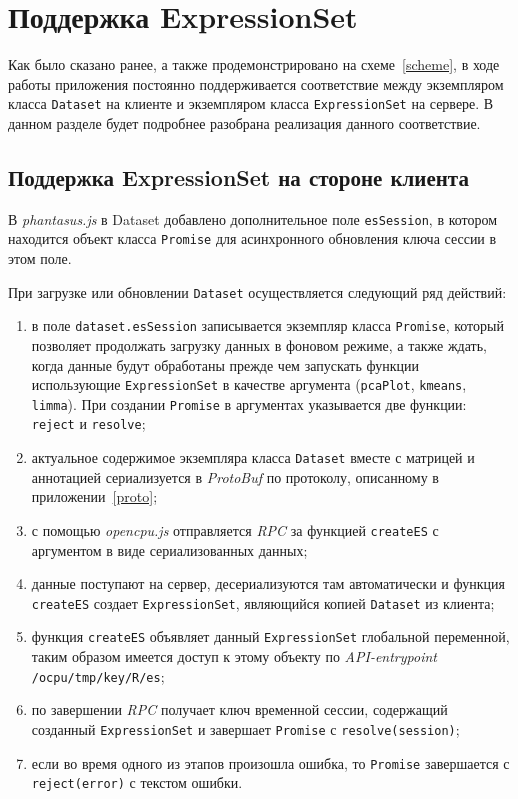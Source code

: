 \section{Поддержка ExpressionSet}
Как было сказано ранее, а также продемонстрировано на схеме~\ref{scheme}, в ходе работы приложения постоянно поддерживается соответствие между экземпляром класса \texttt{Dataset} на клиенте и экземпляром класса \texttt{ExpressionSet} на сервере. В данном разделе будет подробнее разобрана реализация данного соответствие.
\subsection{Поддержка ExpressionSet на стороне клиента}
В \emph{phantasus.js} в Dataset добавлено дополнительное поле \texttt{esSession}, в котором находится объект класса \texttt{Promise} для асинхронного обновления ключа сессии в этом поле.

При загрузке или обновлении \texttt{Dataset} осуществляется следующий ряд действий:
\begin{enumerate}
\item в поле \texttt{dataset.esSession} записывается экземпляр класса \texttt{Promise}, который позволяет продолжать загрузку данных в фоновом режиме, а также ждать, когда данные будут обработаны прежде чем запускать функции использующие \texttt{ExpressionSet} в качестве аргумента (\texttt{pcaPlot}, \texttt{kmeans}, \texttt{limma}). При создании \texttt{Promise} в аргументах указывается две функции: \texttt{reject} и \texttt{resolve};
\item актуальное содержимое экземпляра класса \texttt{Dataset} вместе с матрицей и аннотацией сериализуется в \emph{ProtoBuf} по протоколу, описанному в приложении~\ref{proto};
\item с помощью \emph{opencpu.js} отправляется \emph{RPC} за функцией \texttt{createES} с аргументом в виде сериализованных данных;
\item данные поступают на сервер, десериализуются там автоматически и функция \texttt{createES} создает \texttt{ExpressionSet}, являющийся копией \texttt{Dataset} из клиента;
\item функция \texttt{createES} объявляет данный \texttt{ExpressionSet} глобальной переменной, таким образом имеется доступ к этому объекту по \emph{API-entrypoint} \texttt{/ocpu/tmp/{key}/R/es};
\item по завершении \emph{RPC} получает ключ временной сессии, содержащий созданный \texttt{ExpressionSet} и завершает \texttt{Promise} с \texttt{resolve(session)};
\item если во время одного из этапов произошла ошибка, то \texttt{Promise} завершается с \texttt{reject(error)} с текстом ошибки.
\end{enumerate}

